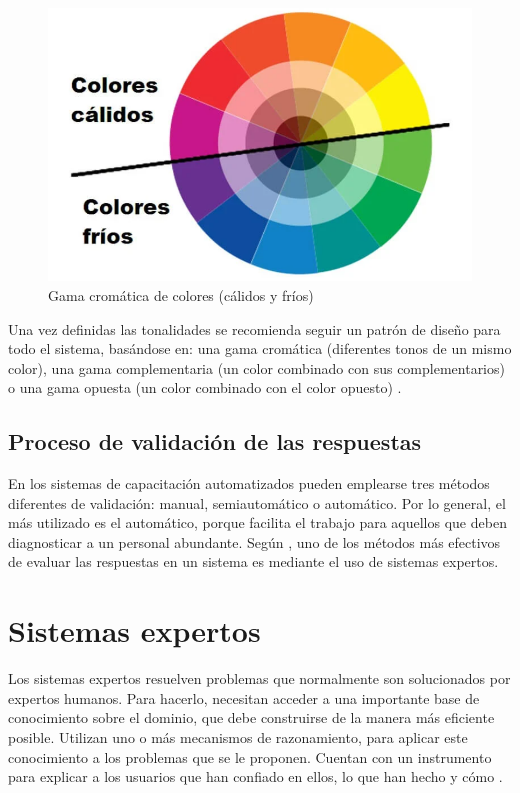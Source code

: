 \begin{figure}[h]
\centering
 \includegraphics[width=0.6\linewidth]{imagen/gama.png}
 \caption{Gama cromática de colores (cálidos y fríos)}
 \label{fig:colores} 
\end{figure}

Una vez definidas las tonalidades se recomienda seguir un patrón de diseño para todo el sistema, basándose en: una gama cromática (diferentes tonos de un mismo color), una gama complementaria (un color combinado con sus complementarios) o una gama opuesta (un color combinado con el color opuesto) \cite{TerronLopez2022}.

\subsection{Proceso de validación de las respuestas}
En los sistemas de capacitación automatizados pueden emplearse tres métodos diferentes de validación: manual, semiautomático o automático. Por lo general, el más utilizado es el automático, porque facilita el trabajo para aquellos que deben diagnosticar a un personal abundante. Según \cite{AltyJames1984}, uno de los métodos más efectivos de evaluar las respuestas en un sistema es mediante el uso de sistemas expertos.


\section{Sistemas expertos}
Los sistemas expertos resuelven problemas que normalmente son solucionados por expertos humanos. Para hacerlo, necesitan acceder a una importante base de conocimiento sobre el dominio, que debe construirse de la manera más eficiente posible. Utilizan uno o más mecanismos de razonamiento, para aplicar este conocimiento a los problemas que se le proponen. Cuentan con un instrumento para explicar a los usuarios que han confiado en ellos, lo que han hecho y cómo \cite{VonRueden2021}.

